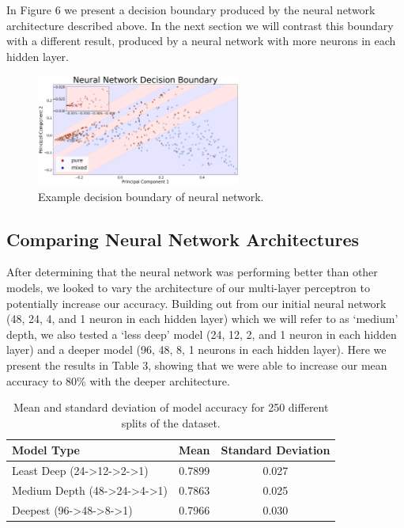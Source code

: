 \documentclass[12pt]{article}
\begin{document}
In Figure 6 we present a decision boundary produced by the neural network architecture described above. In the next section we will contrast this boundary with a different result, produced by a neural network with more neurons in each hidden layer. 

\begin{figure}[H]
\centering
\includegraphics[width=0.6\textwidth]{initialboundary}
\caption{Example decision boundary of neural network.}
\end{figure}

\subsection{Comparing Neural Network Architectures}

After determining that the neural network was performing better than other models, we looked to vary the architecture of our multi-layer perceptron to potentially increase our accuracy. Building out from our initial neural network (48, 24, 4, and 1 neuron in each hidden layer) which we will refer to as `medium’ depth, we also tested a `less deep’ model (24, 12, 2, and 1 neuron in each hidden layer) and a deeper model (96, 48, 8, 1 neurons in each hidden layer). Here we present the results in Table 3, showing that we were able to increase our mean accuracy to 80\% with the deeper architecture. 

\begin{table}[H]
\centering
\begin{tabular}{|l|c|c|}
\hline
\multicolumn{1}{|l|}{Model Type} & Mean & \multicolumn{1}{l|}{Standard Deviation} \\ \hline
Least Deep (24-\textgreater{}12-\textgreater{}2-\textgreater{}1) & 0.7899 & 0.027 \\
\hline
Medium Depth (48-\textgreater{}24-\textgreater{}4-\textgreater{}1) & 0.7863 & 0.025 \\
\hline
Deepest (96-\textgreater{}48-\textgreater{}8-\textgreater{}1) & 0.7966 & 0.030 \\
\hline
\end{tabular}
\caption{Mean and standard deviation of model accuracy for 250 different splits of the dataset.}
\end{table}
\end{document}
